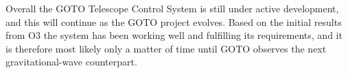 \begin{colsection}
\begin{colsection}
\bigskip

Overall the GOTO Telescope Control System is still under active development, and this will continue as the GOTO project evolves. Based on the initial results from O3 the system has been working well and fulfilling its requirements, and it is therefore most likely only a matter of time until GOTO observes the next gravitational-wave counterpart.

\end{colsection}


\end{colsection}


